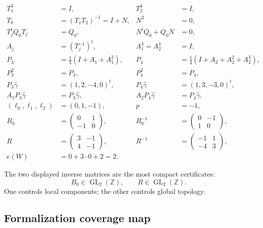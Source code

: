 \documentclass[11pt,reqno]{amsart}
\numberwithin{equation}{section}
\newcommand{\Z}{\mathbb Z}
\newcommand{\wideg}{\widehat\gamma}
\theoremstyle{definition}
\begin{document}
\begin{align*}
T_1^3&=I,&T_2^4&=I,\\
T_0&=(T_1T_2)^{-1}=I+N,&N^2&=0,\\
T_j^tQ_0T_j&=Q_0,&N^tQ_0+Q_0N&=0,\\
A_j&=(T_j^{-1})^t,&A_1^3=A_2^4&=I,\\
P_3&=\tfrac13(I+A_1+A_1^2),&P_4&=\tfrac14(I+A_2+A_2^2+A_2^3),\\
P_3^2&=P_3,&P_4^2&=P_4,\\
P_3\wideg&=(1,2,-4,0)^t,&P_4\wideg&=(1,3,-3,0)^t,\\
A_1P_3\wideg&=P_3\wideg,&A_2P_4\wideg&=P_4\wideg,\\
(\ell_0,\ell_1,\ell_2)&=(0,1,-1),&p&=-1,\\
B_0&=\begin{pmatrix}0&1\\-1&0\end{pmatrix},&B_0^{-1}&=\begin{pmatrix}0&-1\\1&0\end{pmatrix},\\
R&=\begin{pmatrix}3&-1\\4&-1\end{pmatrix},&R^{-1}&=\begin{pmatrix}-1&1\\-4&3\end{pmatrix},\\
e(W)&=0+3\cdot0+2=2.&&
\end{align*}

The two displayed inverse matrices are the most compact certificates:
\[
B_0\in\operatorname{GL}_2(\Z),
\qquad
R\in\operatorname{GL}_2(\Z).
\]
One controls local components; the other controls global topology.


\subsection{Formalization coverage map}\label{sec:coverage}
\end{document}
